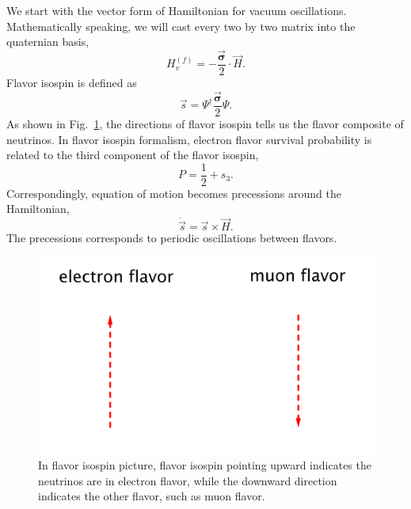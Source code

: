 We start with the vector form of Hamiltonian for vacuum oscillations. Mathematically speaking, we will cast every two by two matrix into the quaternian basis,
\begin{equation}
    H_v^{(f)} = - \frac{\vec{\boldsymbol{\sigma}} }{2}\cdot \vec H.
\end{equation}
Flavor isospin is defined as
\begin{equation}
    \vec s = \Psi^{\dagger} \frac{\vec{\boldsymbol{\sigma}} }{2} \Psi.
\end{equation}
As shown in Fig.~\ref{chap:basics-sec:flavor-isospin-pic-fig:flavor-isospin-illus}, the directions of flavor isospin tells us the flavor composite of neutrinos. In flavor isospin formalism, electron flavor survival probability is related to the third component of the flavor isospin,
\vspace*{0pt}
\begin{equation*}
P = \frac{1}{2} + s_3.
\end{equation*}
Correspondingly, equation of motion becomes precessions around the Hamiltonian,
\begin{equation}
\dot{\vec s} = \vec s \times \vec H.
\label{chap:basics-sec:flavor-isospin-pic-eqn:eom-precession}
\end{equation}
The precessions corresponds to periodic oscillations between flavors.

\begin{figure}
    \centering
    \vspace*{-10pt}
    \includegraphics[width=\textwidth]{chapters/assets/basics/flavor-isospin-illus}
    \caption{In flavor isospin picture, flavor isospin pointing upward indicates the neutrinos are in electron flavor, while the downward direction indicates the other flavor, such as muon flavor.}
    \label{chap:basics-sec:flavor-isospin-pic-fig:flavor-isospin-illus}
\end{figure}

